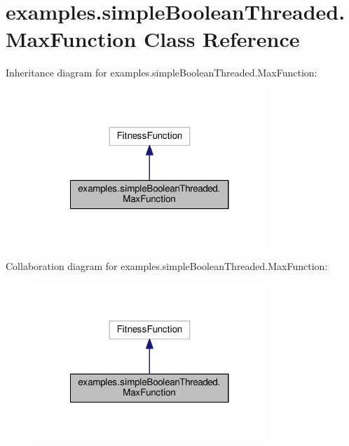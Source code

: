 \hypertarget{classexamples_1_1simple_boolean_threaded_1_1_max_function}{\section{examples.\-simple\-Boolean\-Threaded.\-Max\-Function Class Reference}
\label{classexamples_1_1simple_boolean_threaded_1_1_max_function}
}


Inheritance diagram for examples.\-simple\-Boolean\-Threaded.\-Max\-Function\-:
\nopagebreak
\begin{figure}[H]
\begin{center}
\leavevmode
\includegraphics[width=248pt]{classexamples_1_1simple_boolean_threaded_1_1_max_function__inherit__graph}
\end{center}
\end{figure}


Collaboration diagram for examples.\-simple\-Boolean\-Threaded.\-Max\-Function\-:
\nopagebreak
\begin{figure}[H]
\begin{center}
\leavevmode
\includegraphics[width=248pt]{classexamples_1_1simple_boolean_threaded_1_1_max_function__coll__graph}
\end{center}
\end{figure}
